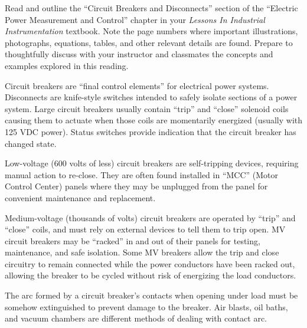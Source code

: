 

Read and outline the ``Circuit Breakers and Disconnects'' section of the ``Electric Power Measurement and Control'' chapter in your {\it Lessons In Industrial Instrumentation} textbook.  Note the page numbers where important illustrations, photographs, equations, tables, and other relevant details are found.  Prepare to thoughtfully discuss with your instructor and classmates the concepts and examples explored in this reading.













Circuit breakers are ``final control elements'' for electrical power systems.  Disconnects are knife-style switches intended to safely isolate sections of a power system.  Large circuit breakers usually contain ``trip'' and ``close'' solenoid coils causing them to actuate when those coils are momentarily energized (usually with 125 VDC power).  Status switches provide indication that the circuit breaker has changed state.

\vskip 10pt

Low-voltage (600 volts of less) circuit breakers are self-tripping devices, requiring manual action to re-close.  They are often found installed in ``MCC'' (Motor Control Center) panels where they may be unplugged from the panel for convenient maintenance and replacement.

\vskip 10pt

Medium-voltage (thousands of volts) circuit breakers are operated by ``trip'' and ``close'' coils, and must rely on external devices to tell them to trip open.  MV circuit breakers may be ``racked'' in and out of their panels for testing, maintenance, and safe isolation.  Some MV breakers allow the trip and close circuitry to remain connected while the power conductors have been racked out, allowing the breaker to be cycled without risk of energizing the load conductors.

The arc formed by a circuit breaker's contacts when opening under load must be somehow extinguished to prevent damage to the breaker.  Air blasts, oil baths, and vacuum chambers are different methods of dealing with contact arc.

